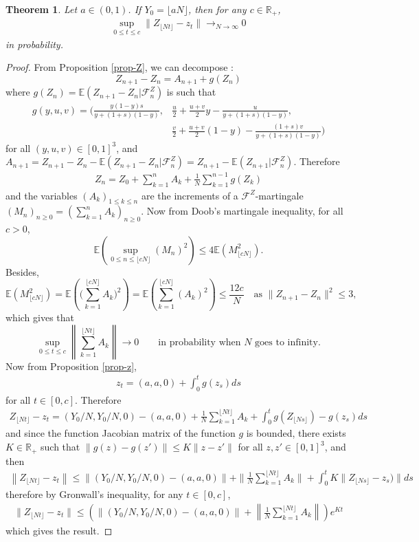 \documentclass[11pt]{article}
\newtheorem{theorem}{Theorem}[section]
\theoremstyle{remark}
\numberwithin{equation}{section}
\begin{document}
\begin{theorem}\label{thmCvceDeterministe} Let $a\in(0,1)$. If $Y_0=\lfloor aN\rfloor$, then for any $c\in\mathbb{R}_+$, \begin{align}
    \sup_{0\leq t\leq c}\|Z_{\lfloor Nt\rfloor}-z_t\|\longrightarrow_{N\rightarrow\infty}0
\end{align} in probability.
\end{theorem}
\begin{proof}
From Proposition \ref{prop-Z}, we can decompose : $$Z_{n+1}-Z_n=A_{n+1}+g(Z_n)$$ where $g(Z_n)=\mathbb{E}(Z_{n+1}-Z_n|\mathcal{F}^Z_n)$ is such that \begin{align*}
    g(y,u,v)=\Big(\frac{y(1-y)s}{y+(1+s)(1-y)},&\frac{u}{2}+\frac{u+v}{2}y-\frac{u}{y+(1+s)(1-y)},\\&\frac{v}{2}+\frac{u+v}{2}(1-y)-\frac{(1+s)v}{y+(1+s)(1-y)}\Big)\end{align*} for all $(y,u,v)\in[0,1]^3$, and $A_{n+1}=Z_{n+1}-Z_n-\mathbb{E}(Z_{n+1}-Z_n|\mathcal{F}^Z_n)=Z_{n+1}-\mathbb{E}(Z_{n+1}|\mathcal{F}^Z_n)$. Therefore
\begin{align}
    Z_n=Z_0+\sum_{k=1}^n A_k+\frac{1}{N}\sum_{k=1}^{n-1} g(Z_k)
\end{align}
and the variables $(A_k)_{1\leq k\leq n}$
are the increments of a $\mathcal{F}^Z$-martingale $(M_n)_{n\geq 0}=(\sum_{k=1}^nA_k)_{n\geq 0}$. 
Now from Doob's martingale inequality, for all $c>0$, 
$$\mathbb{E}\left(\sup_{0\leq n\leq \lfloor c N\rfloor} (M_n)^2\right)\leq  4\mathbb{E}\left(M_{\lfloor cN\rfloor}^2\right).$$ 
Besides, $$\mathbb{E}(M_{\lfloor cN\rfloor}^2)=\mathbb{E}\left(\Big(\sum_{k=1}^{\lfloor cN\rfloor}A_k\Big)^2\right)=\mathbb{E}\left(\sum_{k=1}^{\lfloor cN\rfloor}(A_k)^2\right)\leq \frac{12c}{N}\quad\text{as $\|Z_{n+1}-Z_n\|^2\leq 3$,}$$ which gives that 
$$\sup_{0\leq t\leq c}\left\|\sum_{k=1}^{\lfloor Nt\rfloor} A_k \right\|\longrightarrow 0 \quad\quad \text{in probability when $N$ goes to infinity.}$$ 
Now from Proposition \ref{prop-z},
\begin{align}
    z_t=(a,a,0)+\int_{0}^{t}g(z_s)ds
\end{align} for all $t\in[0,c]$.
Therefore 
\begin{align}
    Z_{\lfloor Nt\rfloor}-z_t=(Y_0/N,Y_0/N,0)-(a,a,0)+\frac{1}{N}\sum_{k=1}^{\lfloor Nt\rfloor}A_k+\int_0^t g(Z_{\lfloor Ns\rfloor})-g(z_s)ds
\end{align}
and since the function Jacobian matrix of the function $g$ is bounded, there exists $K\in\mathbb{R}_+$ such that $\|g(z)-g(z')\|\leq K\|z-z'\|$ for all $z,z'\in[0,1]^3$, and then
\begin{align}
    \left\|Z_{\lfloor Nt\rfloor}-z_t\right\|\leq\|(Y_0/N,Y_0/N,0)-(a,a,0)\|+\|\frac{1}{N}\sum_{k=1}^{\lfloor Nt\rfloor}A_k\|+\int_0^t K\|Z_{\lfloor Ns\rfloor}-z_s)\|ds
\end{align} 
therefore by Gronwall's inequality, for any $t\in[0,c]$,
\begin{align}
    \|Z_{\lfloor Nt\rfloor}-z_t\|\leq\left(\|(Y_0/N,Y_0/N,0)-(a,a,0)\|+\left\|\frac{1}{N}\sum_{k=1}^{\lfloor Nt\rfloor}A_k\right\|\right)e^{Kt}
\end{align} which gives the result.
\end{proof}
\end{document}
